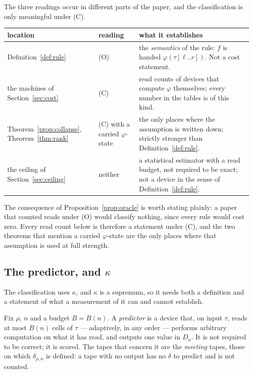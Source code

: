 \begin{remark}\label{rem:which}
The three readings occur in different parts of the paper, and the classification is only meaningful
under (C).
\begin{center}
\small
\begin{tabular}{@{}p{}p{}p{}@{}}
\toprule
location & reading & what it establishes \\
\midrule
Definition~\ref{def:rule} & (O) & the \emph{semantics} of the rule: $f$ is handed
$\varphi(\tau[\ell..r])$. Not a cost statement.\\
the machines of Section~\ref{sec:cost} & (C) & read counts of devices that compute $\varphi$
themselves; every number in the tables is of this kind.\\
Theorem~\ref{prop:collapse}, Theorem~\ref{thm:rank} & (C) with a carried $\varphi$-state & the only
places where the assumption is written down; strictly stronger than Definition~\ref{def:rule}.\\
the ceiling of Section~\ref{sec:ceiling} & neither & a statistical estimator with a read budget, not
required to be exact; not a device in the sense of Definition~\ref{def:rule}.\\
\bottomrule
\end{tabular}
\end{center}
\end{remark}

\noindent The consequence of Proposition~\ref{prop:oracle} is worth stating plainly: a paper that
counted reads under (O) would classify nothing, since every rule would cost zero. Every read count
below is therefore a statement under (C), and the two theorems that mention a carried $\varphi$-state
are the only places where that assumption is used at full strength.

\subsection{The predictor, and $\kappa$}\label{app:kappa}

The classification uses $\kappa$, and $\kappa$ is a supremum, so it needs both a definition and a
statement of what a measurement of it can and cannot establish.

\begin{definition}[Predictor]\label{def:predictor}
Fix $\rho$, $n$ and a budget $B=B(n)$. A \emph{predictor} is a device that, on input $\tau$, reads at
most $B(n)$ cells of $\tau$ --- adaptively, in any order --- performs arbitrary computation on what it
has read, and outputs one value in $D_n$. It is not required to be correct; it is scored. The tapes
that concern it are the \emph{meeting} tapes, those on which $\delta_{\rho,n}$ is defined: a tape with
no output has no $\delta$ to predict and is not counted.
\end{definition}


